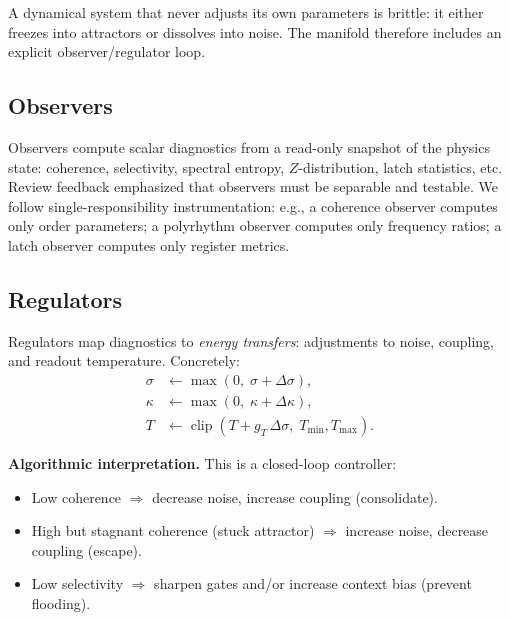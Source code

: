 \documentclass[11pt,a4paper]{article}
\newcommand{\temperature}{T}
\newcommand{\coupling}{\kappa}
\newcommand{\noise}{\sigma}
\begin{document}
A dynamical system that never adjusts its own parameters is brittle: it either freezes into attractors or dissolves into noise. The manifold therefore includes an explicit observer/regulator loop.

\subsection{Observers}
Observers compute scalar diagnostics from a read-only snapshot of the physics state: coherence, selectivity, spectral entropy, $Z$-distribution, latch statistics, etc. Review feedback emphasized that observers must be separable and testable. We follow single-responsibility instrumentation: e.g., a coherence observer computes only order parameters; a polyrhythm observer computes only frequency ratios; a latch observer computes only register metrics.

\subsection{Regulators}
Regulators map diagnostics to \emph{energy transfers}: adjustments to noise, coupling, and readout temperature. Concretely:
\begin{align}
\noise &\leftarrow \max(0,\;\noise + \Delta\noise),\\
\coupling &\leftarrow \max(0,\;\coupling + \Delta\coupling),\\
\temperature &\leftarrow \operatorname{clip}\!\left(\temperature + g_T\,\Delta\noise,\;\temperature_{\min},\temperature_{\max}\right).
\end{align}

\begin{algobox}
\textbf{Algorithmic interpretation.}
This is a closed-loop controller:
\begin{itemize}[nosep]
  \item Low coherence $\Rightarrow$ decrease noise, increase coupling (consolidate).
  \item High but stagnant coherence (stuck attractor) $\Rightarrow$ increase noise, decrease coupling (escape).
  \item Low selectivity $\Rightarrow$ sharpen gates and/or increase context bias (prevent flooding).
\end{itemize}
\end{algobox}

\end{document}
